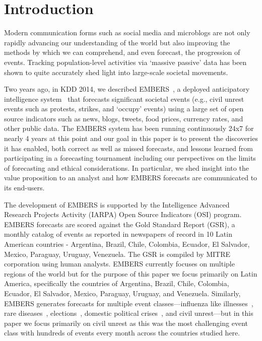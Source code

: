 \documentclass[11pt,a4paper,extrafontsizes,oneside]{article}
\begin{document}
\section{Introduction}
Modern communication forms such as social media and microblogs are not only rapidly
advancing our understanding of the world but also improving the methods by which we can
comprehend, and even forecast, the progression of events.
Tracking population-level activities via `massive passive' data has been shown to
quite accurately shed light into large-scale societal movements.

Two years ago, in KDD 2014, we described EMBERS~\cite{kdd:beating-the-news}, a deployed anticipatory
intelligence system~\cite{bigdata-andy-doyle-embers-paper} that forecasts significant
societal events (e.g., civil unrest
events such as protests, strikes, and `occupy' events) using a large set of open source
indicators such as news, blogs, tweets, food prices, currency rates, and other public
data. The EMBERS system has been running continuously 24x7 for nearly 4 years at this point
and our goal in this paper is to present the discoveries it has enabled,
both correct as well as missed
forecasts, and lessons learned from participating in a forecasting tournament including
our perspectives on the limits of forecasting and ethical considerations. In
particular, we shed insight into the value proposition to an analyst and how EMBERS forecasts
are communicated to its end-users.

The development of EMBERS is supported by the Intelligence Advanced Research Projects
Activity (IARPA) Open Source Indicators (OSI) program.
EMBERS forecasts are scored against the Gold Standard Report (GSR), a monthly catalog of
events as reported in newspapers of record in 10 Latin American
countries - Argentina, Brazil, Chile, Colombia, Ecuador, El Salvador,
Mexico, Paraguay, Uruguay, Venezuela. The GSR is compiled by MITRE corporation
using human analysts.
EMBERS currently focuses on multiple regions of the world but for the purpose of this paper
we focus primarily on Latin America, specifically the countries of
Argentina, Brazil, Chile, Colombia, Ecuador, El Salvador, Mexico, Paraguay, Uruguay, and Venezuela.
Similarly, EMBERS generates forecasts for multiple event classes---influenza like illnesses~\cite{prithwish-ili},
rare diseases~\cite{sdm-saurav}, elections~\cite{aravindan-wei-besc}, domestic political crises~\cite{gdelt-acm-webscience}, and civil unrest---but in this paper we focus primarily on civil unrest as this was the
most challenging event class with hundreds of events every month across the countries studied here.
\end{document}
